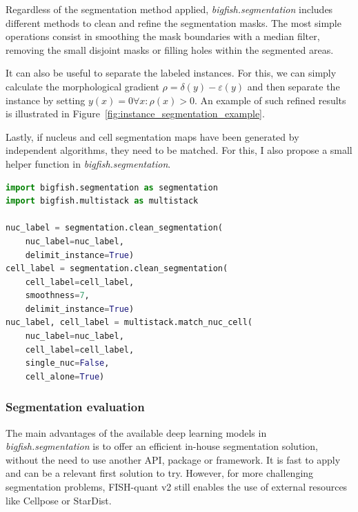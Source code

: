 Regardless of the segmentation method applied, \emph{bigfish.segmentation} includes different methods to clean and refine the segmentation masks.
The most simple operations consist in smoothing the mask boundaries with a median filter, removing the small disjoint masks or filling holes within the segmented areas.

It can also be useful to separate the labeled instances. For this, we can simply calculate the morphological gradient $\rho = \delta(y) - \varepsilon(y)$ and then separate the instance by setting $y(x) = 0 \forall x: \rho(x) > 0$. 
An example of such refined results is illustrated in Figure~\ref{fig:instance_segmentation_example}.

Lastly, if nucleus and cell segmentation maps have been generated by independent algorithms, they need to be matched. For this, I also propose a small helper function in \emph{bigfish.segmentation}. 


\begin{minipage}{0.9\textwidth}
\begin{lstlisting}[language=Python]
import bigfish.segmentation as segmentation
import bigfish.multistack as multistack

nuc_label = segmentation.clean_segmentation(
	nuc_label=nuc_label,
	delimit_instance=True)
cell_label = segmentation.clean_segmentation(
	cell_label=cell_label,
	smoothness=7,
	delimit_instance=True)
nuc_label, cell_label = multistack.match_nuc_cell(
	nuc_label=nuc_label,
	cell_label=cell_label,
	single_nuc=False,
	cell_alone=True)
\end{lstlisting}
\end{minipage}

\subsubsection{Segmentation evaluation}

The main advantages of the available deep learning models in \emph{bigfish.segmentation} is to offer an efficient in-house segmentation solution, without the need to use another API, package or framework.
It is fast to apply and can be a relevant first solution to try.
However, for more challenging segmentation problems, FISH-quant v2 still enables the use of external resources like Cellpose or StarDist.

